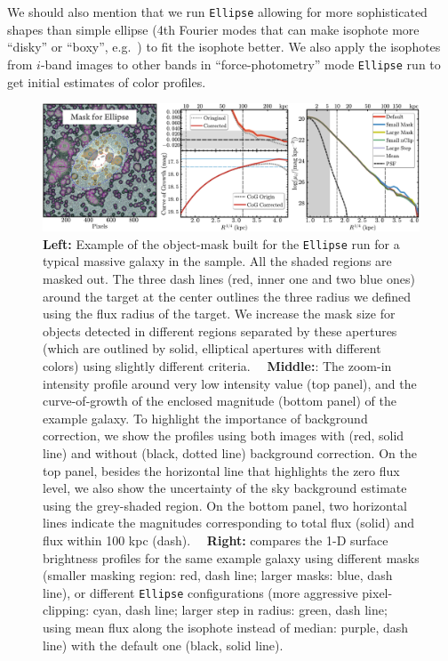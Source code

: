 \documentclass[a4paper,fleqn,usenatbib]{mnras}
\begin{document}
    We should also mention that we run \texttt{Ellipse} allowing for more 
    sophisticated shapes than simple ellipse (4th Fourier modes that can make 
    isophote more ``disky'' or ``boxy'', e.g.\ \citealt{Kormendy2009}) to fit the 
    isophote better.
    We also apply the isophotes from $i$-band images to other bands in 
    ``force-photometry'' mode \texttt{Ellipse} run to get initial estimates of 
    color profiles.  
    
    \begin{figure}
        \centering 
        \includegraphics[width=\textwidth]{fig/redbcg_ellipse_tech}
        \caption{
            \textbf{Left:} Example of the object-mask built for the \texttt{Ellipse}
            run for a typical massive galaxy in the sample. 
            All the shaded regions are masked out. 
            The three dash lines (red, inner one and two blue ones) around the target 
            at the center outlines the three radius we defined using the flux radius 
            of the target.  
            We increase the mask size for objects detected in different regions 
            separated by these apertures (which are outlined by solid, elliptical 
            apertures with different colors) using slightly different criteria.~~
            \textbf{Middle:}: The zoom-in intensity profile around very low intensity 
            value (top panel), and the curve-of-growth of the enclosed magnitude 
            (bottom panel) of the example galaxy.  
            To highlight the importance of background correction, we show the profiles 
            using both images with (red, solid line) and without (black, dotted line) 
            background correction. 
            On the top panel, besides the horizontal line that highlights the zero flux 
            level, we also show the uncertainty of the sky background estimate using 
            the grey-shaded region.  
            On the bottom panel, two horizontal lines indicate the magnitudes 
            corresponding to total flux (solid) and flux within 100 kpc (dash).~~
            \textbf{Right:} compares the 1-D surface brightness profiles for the same 
            example galaxy using different masks 
            (smaller masking region: red, dash line; larger masks: blue, dash line), 
            or different \texttt{Ellipse} configurations
            (more aggressive pixel-clipping: cyan, dash line; 
             larger step in radius: green, dash line; 
             using mean flux along the isophote instead of median: purple, dash line)
            with the default one (black, solid line).
            }
        \label{fig:ell_tech}
    \end{figure}
\end{document}
